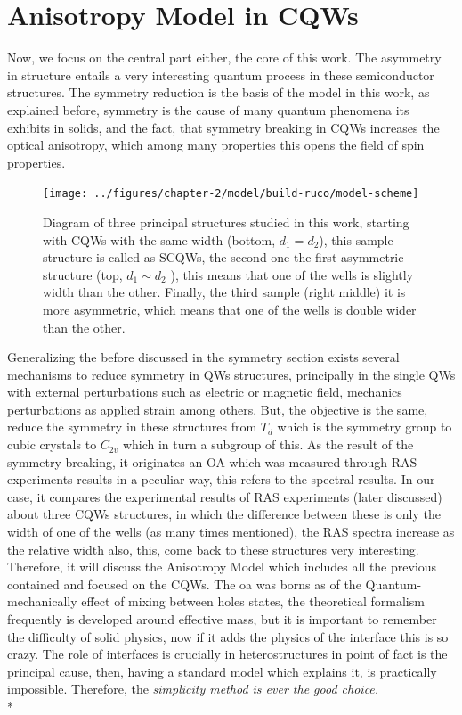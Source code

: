 \section{Anisotropy Model in CQWs}
\label{subsec:chapter-2-anisotropy-model}
\vspace{-10mm} 
Now, we focus on the central part either, the core of this work. The asymmetry in structure entails a very interesting quantum process in these semiconductor structures. The symmetry reduction is the basis of the model in this work, as explained before, symmetry is the cause of many quantum phenomena its exhibits in solids, and the fact, that symmetry breaking in \gls{CQWs} increases the optical anisotropy, which among many properties this opens the field of spin properties\cite{sivalertporn2012direct,averkiev2006spin,kotova2016optical,schonhuber2014inelastic,tronc2012spin}.\\
\begin{figure}[b]
	\centering
	\texttt{[image: ../figures/chapter-2/model/build-ruco/model-scheme]}
	\caption{Diagram of three principal structures studied in this work, starting with CQWs with the same width (bottom, $d_{1}=d_{2}$), this sample structure is called as SCQWs, the second one the first asymmetric structure (top, $d_{1}\sim d_{2}$ ), this means that one of the wells is slightly width than the other. Finally, the third sample (right middle) it is more asymmetric, which means that one of the wells is double wider than the other.    }
	\label{fig:chapter-2-anisotropy-model-samples-studied}
\end{figure}
Generalizing the before discussed in the symmetry section exists several mechanisms to reduce symmetry in QWs structures, principally in the single QWs with external perturbations such as electric or magnetic field, mechanics perturbations as applied strain among others.  But, the objective is the same, reduce the symmetry in these structures from  $T_{d}$ which is the symmetry group to cubic crystals to $C_{2v}$ which in turn a  subgroup of this. As the result of the symmetry breaking,  it originates an OA which was measured through \gls{RAS} experiments results in a peculiar way, this refers to the spectral results. In our case, it compares the experimental results of \gls{RAS} experiments (later discussed) about three CQWs structures, in which the difference between these is only the width of one of the wells (as many times mentioned), the \gls{RAS} spectra increase as the relative width also,  this, come back to these structures very interesting.  Therefore, it will discuss the Anisotropy Model which includes all the previous contained and focused on the \gls{CQWs}. The \gls{oa} was borns as of the Quantum-mechanically effect of mixing between holes states, the theoretical formalism frequently is developed around effective mass, but it is important to remember the difficulty of solid physics, now if it adds the physics of the interface this is so crazy. The role of interfaces is crucially in heterostructures in point of fact is the principal cause, then, having a standard model which explains it, is practically impossible. Therefore, the \emph{simplicity method is ever the good choice.}\\*
